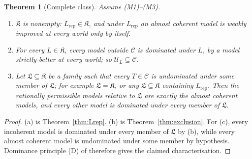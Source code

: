 \documentclass[11pt]{article}
\newcommand{\chg}[1]{{\color{red}#1}}
\newtheorem{theorem}{Theorem}[section]
\theoremstyle{definition}
\theoremstyle{remark}
\newcommand{\C}{\mathcal C}
\newcommand{\U}{\mathcal U}
\newcommand{\K}{\mathfrak K}
\newcommand{\Lf}{\mathfrak L}
\newcommand{\Lrep}{L_{\mathrm{rep}}}
\begin{document}
\begin{theorem}[Complete class]\label{thm:main}
Assume (M1)--(M3).
\begin{enumerate}[label=(\alph*)]
\item $\K$ is nonempty: $\Lrep\in\K$, and under $\Lrep$ an almost coherent model is weakly improved at every world only by itself.
\item For every $L\in\K$, every model outside $\C$ is dominated under $L$, by a model strictly better at every world; so $\U_L\subseteq\C$.
\item Let $\Lf\subseteq\K$ be a family such that every $T\in\C$ is undominated under some member of $\Lf$; for example $\Lf=\K$, or any $\Lf\subseteq\K$ containing $\Lrep$. Then the rationally permissible models relative to $\Lf$ are exactly the almost coherent models, and every other model is dominated under every member of $\Lf$.
\end{enumerate}
\end{theorem}
\begin{proof}
(a) is Theorem~\ref{thm:Lrep}. (b) is Theorem~\ref{thm:exclusion}. \chg{For (c), every incoherent model is dominated under every member of $\Lf$ by (b), while every almost coherent model is undominated under some member by hypothesis. Dominance principle (D) of \cite[\S\ref{GR-sec:gen-dom}]{KonekGR} therefore gives the claimed characterisation.}
\end{proof}



\end{document}
